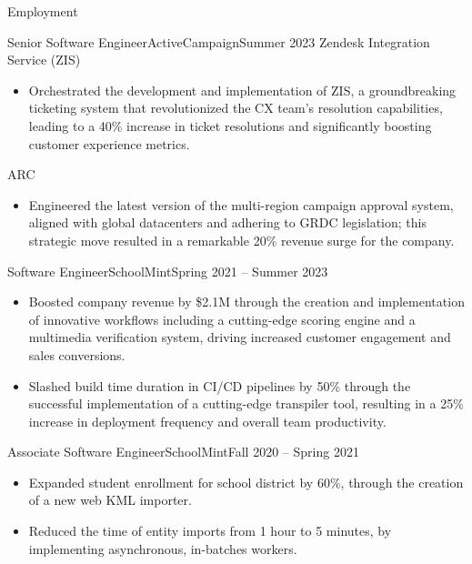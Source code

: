 \documentclass[]{mcdowellcv}
\begin{document}
	\makeheader
	
	\begin{cvsection}{Employment}
		\begin{cvsubsection}{Senior Software Engineer}{ActiveCampaign}{Summer 2023}
			Zendesk Integration Service (ZIS)
			\begin{itemize}
				\item Orchestrated the development and implementation of ZIS, a groundbreaking ticketing system that revolutionized the CX team's resolution capabilities, leading to a 40\% increase in ticket resolutions and significantly boosting customer experience metrics.
			\end{itemize}
			ARC
			\begin{itemize}
				\item Engineered the latest version of the multi-region campaign approval system, aligned with global datacenters and adhering to GRDC legislation; this strategic move resulted in a remarkable 20\% revenue surge for the company.
			\end{itemize}
		\end{cvsubsection}
		\begin{cvsubsection}{Software Engineer}{SchoolMint}{Spring 2021 -- Summer 2023}		
			\begin{itemize}
				\item Boosted company revenue by \$2.1M through the creation and implementation of innovative workflows including a cutting-edge scoring engine and a multimedia verification system, driving increased customer engagement and sales conversions.
				\item Slashed build time duration in CI/CD pipelines by 50\% through the successful implementation of a cutting-edge transpiler tool, resulting in a 25\% increase in deployment frequency and overall team productivity.
			\end{itemize}
		\end{cvsubsection}
		\begin{cvsubsection}{Associate Software Engineer}{SchoolMint}{Fall 2020 -- Spring 2021}	
			\begin{itemize}
				\item Expanded student enrollment for school district by 60\%, through the creation of a new web KML importer.
				\item Reduced the time of entity imports from 1 hour to 5 minutes, by implementing asynchronous, in-batches workers.
			\end{itemize}

\end{cvsubsection}
\end{cvsection}
\end{document}
